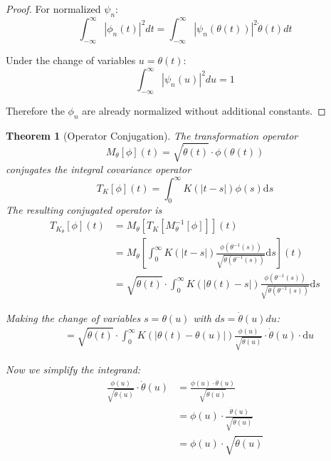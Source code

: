 \documentclass{article}
\newtheorem{theorem}{Theorem}
\newcommand{\dd}{\mathrm{d}}
\newcommand{\dottheta}{\dot{\theta}}
\begin{document}
\begin{proof}
For normalized $\psi_n$:
\begin{equation}
\int_{-\infty}^{\infty} |\phi_n(t)|^2 dt = \int_{-\infty}^{\infty} |\psi_n(\theta(t))|^2 \dottheta(t) dt
\end{equation}

Under the change of variables $u=\theta(t)$:
\begin{equation}
\int_{-\infty}^{\infty} |\psi_n(u)|^2 du = 1
\end{equation}

Therefore the $\phi_n$ are already normalized without additional constants.
\end{proof}

\begin{theorem}[Operator Conjugation]
The transformation operator
\begin{equation}
M_\theta[\phi](t) = \sqrt{\dottheta(t)} \cdot \phi(\theta(t))
\end{equation}
conjugates the integral covariance operator
\begin{equation}
T_K[\phi](t) = \int_0^\infty K(|t-s|) \phi(s) \dd s
\end{equation}
The resulting conjugated operator is
\begin{align}
T_{K_\theta}[\phi](t) &= M_\theta[T_K[M_\theta^{-1}[\phi]]](t)\\
&= M_\theta[\int_0^\infty K(|t-s|)\frac{\phi(\theta^{-1}(s))}{\sqrt{\dottheta(\theta^{-1}(s))}} \dd s](t)\\
&= \sqrt{\dottheta(t)} \cdot \int_0^\infty K(|\theta(t)-s|)\frac{\phi(\theta^{-1}(s))}{\sqrt{\dottheta(\theta^{-1}(s))}} \dd s
\end{align}

Making the change of variables $s = \theta(u)$ with $ds = \dottheta(u)du$:
\begin{align}
&= \sqrt{\dottheta(t)} \cdot \int_0^\infty K(|\theta(t)-\theta(u)|)\frac{\phi(u)}{\sqrt{\dottheta(u)}} \cdot \dottheta(u) \cdot \dd u
\end{align}

Now we simplify the integrand:
\begin{align}
\frac{\phi(u)}{\sqrt{\dottheta(u)}} \cdot \dottheta(u) &= \frac{\phi(u) \cdot \dottheta(u)}{\sqrt{\dottheta(u)}}\\
&= \phi(u) \cdot \frac{\dottheta(u)}{\sqrt{\dottheta(u)}}\\
&= \phi(u) \cdot \sqrt{\dottheta(u)}
\end{align}


\end{theorem}
\end{document}
